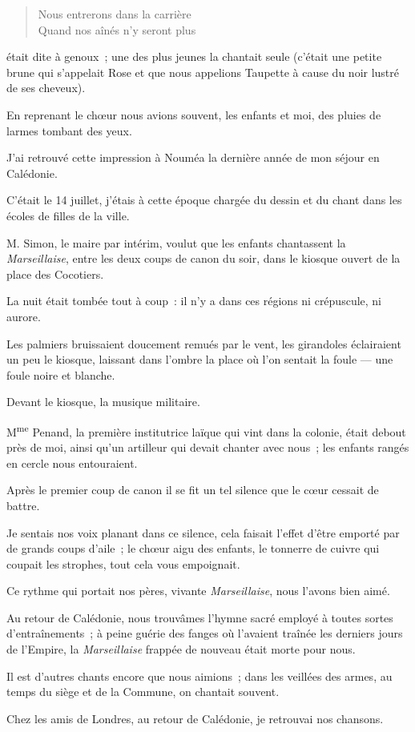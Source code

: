 \documentclass[french,twoside]{book} %
\begin{document}
\begin{verse}
Nous entrerons dans la carrière\\
Quand nos aînés n’y seront plus\\
\end{verse}

\noindent était dite à genoux ; une des plus jeunes la chantait seule (c’était une petite brune qui s’appelait Rose et que nous appelions Taupette à cause du noir lustré de ses cheveux).\par
En reprenant le chœur nous avions souvent,  les enfants et moi, des pluies de larmes tombant des yeux.\par
J’ai retrouvé cette impression à Nouméa la dernière année de mon séjour en Calédonie.\par
C’était le 14 juillet, j’étais à cette époque chargée du dessin et du chant dans les écoles de filles de la ville.\par
M. Simon, le maire par intérim, voulut que les enfants chantassent la \emph{Marseillaise}, entre les deux coups de canon du soir, dans le kiosque ouvert de la place des Cocotiers.\par
La nuit était tombée tout à coup : il n’y a dans ces régions ni crépuscule, ni aurore.\par
Les palmiers bruissaient doucement remués par le vent, les girandoles éclairaient un peu le kiosque, laissant dans l’ombre la place où l’on sentait la foule — une foule noire et blanche.\par
Devant le kiosque, la musique militaire.\par
M\textsuperscript{me} Penand, la première institutrice laïque qui vint dans la colonie, était debout près de moi, ainsi qu’un artilleur qui devait chanter avec nous ; les enfants rangés en cercle nous entouraient.\par
Après le premier coup de canon il se fit un tel silence que le cœur cessait de battre.\par
Je sentais nos voix planant dans ce silence, cela faisait l’effet d’être emporté par de grands  coups d’aile ; le chœur aigu des enfants, le tonnerre de cuivre qui coupait les strophes, tout cela vous empoignait.\par
Ce rythme qui portait nos pères, vivante \emph{Marseillaise}, nous l’avons bien aimé.\par
Au retour de Calédonie, nous trouvâmes l’hymne sacré employé à toutes sortes d’entraînements ; à peine guérie des fanges où l’avaient traînée les derniers jours de l’Empire, la \emph{Marseillaise} frappée de nouveau était morte pour nous.\par
Il est d’autres chants encore que nous aimions ; dans les veillées des armes, au temps du siège et de la Commune, on chantait souvent.\par
Chez les amis de Londres, au retour de Calédonie, je retrouvai nos chansons.\par
\end{document}
